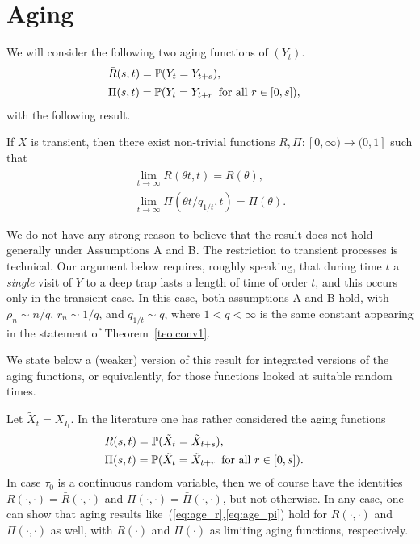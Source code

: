 \section{Aging}
\label{sec:age}
\setcounter{equation}{0}


We will consider the following two aging functions of $(Y_t)$.
\begin{eqnarray}
\label{eq:br}
&\bar R(s,t)=\P(Y_t=Y_{t+s}),&\\
\label{eq:bpi}
&\bar \Pi(s,t)=\P(Y_t=Y_{t+r}\,\mbox{ for all }r\in[0,s]),&
\end{eqnarray}
with the following result.
\begin{theo}
\label{teo:age}
If $X$ is transient, then there exist non-trivial functions $R,\Pi:[0,\infty)\to(0,1]$ such that
\begin{eqnarray}
\label{eq:age_r}
&\lim_{t\to\infty}\bar R(\theta t,t)=R(\theta),&\\
\label{eq:age_pi}
&\lim_{t\to\infty}\bar \Pi(\theta t/q_{1/t},t)=\Pi(\theta).&
\end{eqnarray}
\end{theo}

\begin{rmk}
\label{rmk:trans}
We do not have any strong reason to believe that the result does not hold generally under Assumptions A and B.
The restriction to transient processes is technical. Our argument below requires, roughly speaking, that during 
time $t$ a {\em single} visit of  $Y$ to a deep trap lasts a length of time of order $t$, and this occurs only 
in the transient case. In this case, both assumptions A and B hold, with $\rho_n\sim n/q$, $r_n\sim 1/q$, and 
$q_{1/t}\sim q$, where $1<q<\infty$ is the same constant appearing in the statement of Theorem~\ref{teo:conv1}.

We state below a (weaker) version of this result for integrated versions of the aging functions, or equivalently,
for those functions looked at suitable random times.
\end{rmk}

\begin{rmk}
\label{rmk:age1}
Let $\tilde X_t=X_{I_t}$. In the literature one has rather considered the aging functions
\begin{eqnarray}
\label{eq:r}
&R(s,t)=\P(\tilde X_t=\tilde X_{t+s}),&\\
\label{eq:pi}
&\Pi(s,t)=\P(\tilde X_t=\tilde X_{t+r}\,\mbox{ for all }r\in[0,s]).&
\end{eqnarray}
In case $\tau_0$ is a continuous random variable, then we of course have the identities $R(\cdot,\cdot)=\bar R(\cdot,\cdot)$ 
and $\Pi(\cdot,\cdot)=\bar\Pi(\cdot,\cdot)$, but not otherwise. In any case, one can show that aging results like~(\ref{eq:age_r},\ref{eq:age_pi}) 
hold for $R(\cdot,\cdot)$ and $\Pi(\cdot,\cdot)$ as well, with $R(\cdot)$ and $\Pi(\cdot)$ as limiting aging functions, respectively.
\end{rmk}


